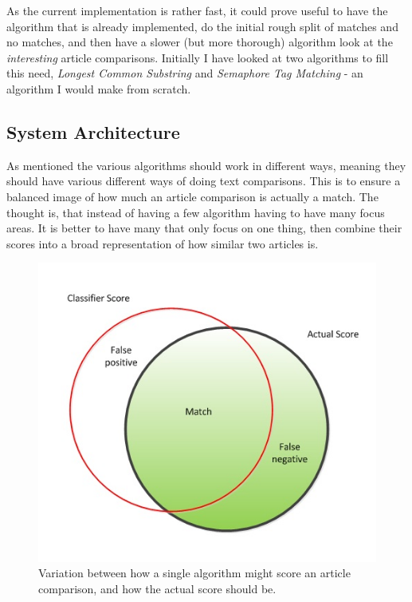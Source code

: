 As the current implementation is rather fast, it could prove useful to have the algorithm that is already implemented, do the initial rough split of matches and no matches, and then have a slower (but more thorough) algorithm look at the \textit{interesting} article comparisons. Initially I have looked at two algorithms to fill this need, \textit{Longest Common Substring} and \textit{Semaphore Tag Matching} - an algorithm I would make from scratch.

\subsection{System Architecture}
As mentioned the various algorithms should work in different ways, meaning they should have various different ways of doing text comparisons. This is to ensure a balanced image of how much an article comparison is actually a match. The thought is, that instead of having a few algorithm having to have many focus areas. It is better to have many that only focus on one thing, then combine their scores into a broad representation of how similar two articles is.

\pagebreak

\begin{figure}
	\centering
	\includegraphics[scale=0.5]{figures/SingleAlgoScore}
	\caption{Variation between how a single algorithm might score an article comparison, and how the actual score should be\cite{Slides}.}
\end{figure}

